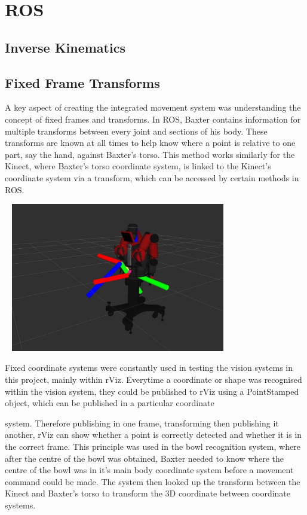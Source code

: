 \section{ROS}
\subsection{Inverse Kinematics}
\subsection{Fixed Frame Transforms}
A key aspect of creating the integrated movement system was understanding the concept of fixed frames and transforms. In ROS, Baxter contains information for multiple transforms between every joint and sections of his body. These transforms are known at all times to help know where a point is relative to one part, say the hand, against Baxter's torso. This method works similarly for the Kinect, where Baxter's torso coordinate system, is linked to the Kinect's coordinate system via a transform, which can be accessed by certain methods in ROS.

\begin{minipage}{0.65\textwidth}
\bigskip
\includegraphics[width = 10cm, height = 6.5cm]{fixedframe.jpg}
\bigskip
\end{minipage}
\hspace{0.5cm}
\begin{minipage}{0.29\textwidth}
\raggedright
Fixed coordinate systems were constantly used in testing the vision systems in this project, mainly within rViz. Everytime a coordinate or shape was recognised within the vision system, they could be published to rViz using a PointStamped object, which can be published in a particular coordinate
\end{minipage}
 system. Therefore publishing in one frame, transforming then publishing it another, rViz can show whether a point is correctly detected and whether it is in the correct frame.
\newline
This principle was used in the bowl recognition system, where after the centre of the bowl was obtained, Baxter needed to know where the centre of the bowl was in it's main body coordinate system before a movement command could be made. The system then looked up the transform between the Kinect and Baxter's torso to transform the 3D coordinate between coordinate systems.
